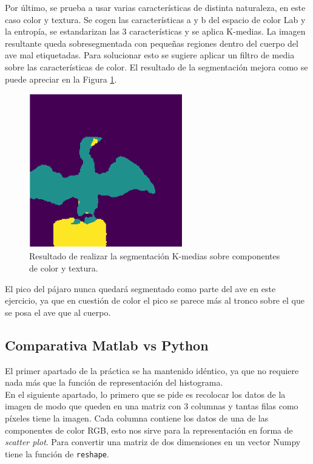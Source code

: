 \documentclass[a4paper,12pt]{report}
\begin{document}
Por último, se prueba a usar varias características de distinta naturaleza, en este caso color y textura. Se cogen las características a y b del espacio de color Lab y la entropía, se estandarizan las 3 características y se aplica K-medias. La imagen resultante queda sobresegmentada con pequeñas regiones dentro del cuerpo del ave mal etiquetadas. Para solucionar esto se sugiere aplicar un filtro de media sobre las características de color. El resultado de la segmentación mejora como se puede apreciar en la Figura \ref{segmentacionabe}.\\ 

\begin{figure}[h]
\centering
\includegraphics[width=0.6\textwidth]{imagenes/segmentacionabe}
\caption{Resultado de realizar la segmentación K-medias sobre componentes de color y textura.}
\label{segmentacionabe}
\end{figure}

El pico del pájaro nunca quedará segmentado como parte del ave en este ejercicio, ya que en cuestión de color el pico se parece más al tronco sobre el que se posa el ave que al cuerpo.\\


\subsection{Comparativa Matlab vs Python}

El primer apartado de la práctica se ha mantenido idéntico, ya que no requiere nada más que la función de representación del histograma.\\

En el siguiente apartado, lo primero que se pide es recolocar los datos de la imagen de modo que queden en una matriz con 3 columnas y tantas filas como píxeles tiene la imagen. Cada columna contiene los datos de una de las componentes de color RGB, esto nos sirve para la representación en forma de \emph{scatter plot}. Para convertir una matriz de dos dimensiones en un vector Numpy tiene la función de \texttt{reshape}. \\
\end{document}
